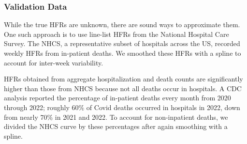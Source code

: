 \documentclass{article}
\newcommand{\ahcomment}[1]{{\color{red}[AH: #1]}}
\begin{document}

\subsubsection{Validation Data}
While the true HFRs are unknown, there are sound ways to approximate them. One such approach is to use line-list HFRs from the National Hospital Care Survey. The NHCS, a representative subset of hospitals across the US, recorded weekly HFRs from in-patient deaths. We smoothed these HFRs with a spline to account for inter-week variability. 

HFRs obtained from aggregate hospitalization and death counts are significantly higher than those from NHCS because not all deaths occur in hospitals. A CDC analysis reported the percentage of in-patient deaths every month from 2020 through 2022; roughly 60\% of Covid deaths occurred in hospitals in 2022, down from nearly 70\% in 2021 and 2022. To account for non-inpatient deaths, we divided the NHCS curve by these percentages after again smoothing with a spline. 

\end{document}
